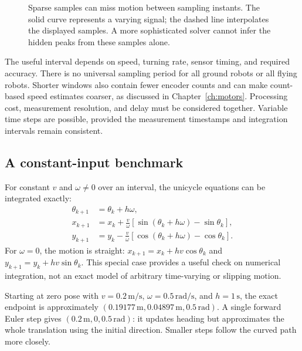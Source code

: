 \begin{figure}[htbp]
\centering
\caption{Sparse samples can miss motion between sampling instants.
The solid curve represents a varying signal; the dashed line interpolates
the displayed samples. A more sophisticated solver cannot infer the hidden
peaks from these samples alone.}
\label{fig:l09-sampling}
\end{figure}

The useful interval depends on speed, turning rate, sensor timing, and
required accuracy. There is no universal sampling period for all ground
robots or all flying robots. Shorter windows also contain fewer encoder
counts and can make count-based speed estimates coarser, as discussed in
Chapter~\ref{ch:motors}. Processing cost, measurement resolution, and delay
must be considered together. Variable time steps are possible, provided
the measurement timestamps and integration intervals remain consistent.

\subsection{A constant-input benchmark}
For constant $v$ and $\omega\ne0$ over an interval, the unicycle equations
can be integrated exactly:
\begin{align}
 \theta_{k+1}&=\theta_k+h\omega,\\
 x_{k+1}&=x_k+\frac v\omega
       [\sin(\theta_k+h\omega)-\sin\theta_k],\\
 y_{k+1}&=y_k-\frac v\omega
       [\cos(\theta_k+h\omega)-\cos\theta_k].
 \label{eq:l09-exact}
\end{align}
For $\omega=0$, the motion is straight:
$x_{k+1}=x_k+hv\cos\theta_k$ and $y_{k+1}=y_k+hv\sin\theta_k$.
This special case provides a useful check on numerical integration, not
an exact model of arbitrary time-varying or slipping motion.

Starting at zero pose with $v=0.2\,\mathrm{m/s}$,
$\omega=0.5\,\mathrm{rad/s}$, and $h=1\,\mathrm s$, the exact endpoint is
approximately $(0.19177\,\mathrm m,0.04897\,\mathrm m,0.5\,\mathrm{rad})$.
A single forward Euler step gives $(0.2\,\mathrm m,0,0.5\,\mathrm{rad})$:
it updates heading but approximates the whole translation using the initial
direction. Smaller steps follow the curved path more closely.

